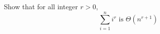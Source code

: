 \documentclass[12pt]{article}
\begin{document}
Show that for all integer $r>0$,
\[ \sum_{i=1}^n\left.i^r\right. \mbox{ is } \Theta(n^{r+1}) \]
\end{document}
